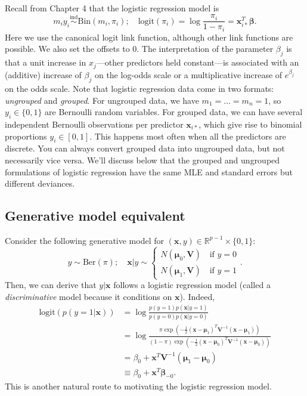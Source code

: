 \documentclass[
  11pt,
  letterpaper,
  oneside]{book}
\theoremstyle{plain}
\theoremstyle{plain}
\theoremstyle{definition}
\theoremstyle{definition}
\theoremstyle{plain}
\theoremstyle{remark}
\begin{document}
Recall from Chapter 4 that the logistic regression model is \[
m_i y_i \overset{\text{ind}} \sim \text{Bin}(m_i, \pi_i); \quad \text{logit}(\pi_i) = \log\frac{\pi_i}{1-\pi_i} = \boldsymbol{x}^T_{i*}\boldsymbol{\beta}.
\] Here we use the canonical logit link function, although other link
functions are possible. We also set the offsets to 0. The interpretation
of the parameter \(\beta_j\) is that a unit increase in \(x_j\)---other
predictors held constant---is associated with an (additive) increase of
\(\beta_j\) on the log-odds scale or a multiplicative increase of
\(e^{\beta_j}\) on the odds scale. Note that logistic regression data
come in two formats: \emph{ungrouped} and \emph{grouped}. For ungrouped
data, we have \(m_1 = \dots = m_n = 1\), so \(y_i \in \{0,1\}\) are
Bernoulli random variables. For grouped data, we can have several
independent Bernoulli observations per predictor
\(\boldsymbol{x}_{i*}\), which give rise to binomial proportions
\(y_i \in [0,1]\). This happens most often when all the predictors are
discrete. You can always convert grouped data into ungrouped data, but
not necessarily vice versa. We'll discuss below that the grouped and
ungrouped formulations of logistic regression have the same MLE and
standard errors but different deviances.

\hypertarget{generative-model-equivalent}{%
\subsection{Generative model
equivalent}\label{generative-model-equivalent}}

Consider the following generative model for
\((\boldsymbol{x}, y) \in \mathbb{R}^{p-1} \times \{0,1\}\): \[
y \sim \text{Ber}(\pi); \quad \boldsymbol{x}|y \sim \begin{cases} N(\boldsymbol{\mu}_0, \boldsymbol{V}) \quad \text{if } y = 0 \\ N(\boldsymbol{\mu}_1, \boldsymbol{V}) \quad \text{if } y = 1 \end{cases}.
\] Then, we can derive that \(y|\boldsymbol{x}\) follows a logistic
regression model (called a \emph{discriminative} model because it
conditions on \(\boldsymbol{x}\)). Indeed, \[
\begin{aligned}
\text{logit}(p(y = 1|\boldsymbol{x})) &= \log\frac{p(y = 1)p(\boldsymbol{x}|y = 1)}{p(y = 0)p(\boldsymbol{x}|y = 0)} \\
&= \log\frac{\pi \exp\left(-\frac12(\boldsymbol{x} - \boldsymbol{\mu}_1)^T \boldsymbol{V}^{-1}(\boldsymbol{x} - \boldsymbol{\mu}_1)\right)}{(1-\pi) \exp\left(-\frac12(\boldsymbol{x} - \boldsymbol{\mu}_0)^T \boldsymbol{V}^{-1}(\boldsymbol{x} - \boldsymbol{\mu}_0)\right)} \\
&= \beta_0 + \boldsymbol{x}^T \boldsymbol{V}^{-1}(\boldsymbol{\mu}_1 - \boldsymbol{\mu}_0) \\
&\equiv \beta_0 + \boldsymbol{x}^T \boldsymbol{\beta}_{-0}.
\end{aligned}
\] This is another natural route to motivating the logistic regression
model.
\end{document}
